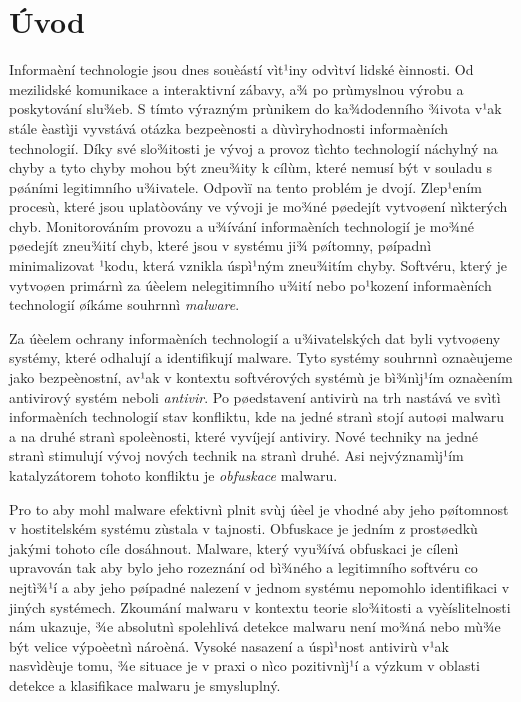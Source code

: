 

\chapter{Úvod}
Informaèní technologie jsou dnes souèástí vìt¹iny odvìtví lidské èinnosti. Od mezilidské komunikace a interaktivní zábavy, a¾ po prùmyslnou výrobu a poskytování slu¾eb. S tímto výrazným prùnikem do ka¾dodenního ¾ivota v¹ak stále èastìji vyvstává otázka bezpeènosti a dùvìryhodnosti informaèních technologií. Díky své slo¾itosti je vývoj a provoz tìchto technologií náchylný na chyby a tyto chyby mohou být zneu¾ity k cílùm, které nemusí být v souladu s pøáními legitimního u¾ivatele. Odpovìï na tento problém je dvojí. Zlep¹ením procesù, které jsou uplatòovány ve vývoji je mo¾né pøedejít vytvoøení nìkterých chyb. Monitorováním provozu a u¾ívání informaèních technologií je mo¾né pøedejít zneu¾ití chyb, které jsou v systému ji¾ pøítomny, pøípadnì minimalizovat ¹kodu, která vznikla úspì¹ným zneu¾itím chyby. Softvéru, který je vytvoøen primárnì za úèelem nelegitimního u¾ití nebo po¹kození informaèních technologií øíkáme souhrnnì \emph{malware}. 

Za úèelem ochrany informaèních technologií a u¾ivatelských dat byli vytvoøeny systémy, které odhalují a identifikují malware. Tyto systémy souhrnnì oznaèujeme jako bezpeènostní, av¹ak v kontextu softvérových systémù je bì¾nìj¹ím oznaèením antivirový systém neboli \emph{antivir}. Po pøedstavení antivirù na trh nastává ve svìtì informaèních technologií stav konfliktu, kde na jedné stranì stojí autoøi malwaru a na druhé stranì spoleènosti, které vyvíjejí antiviry. Nové techniky na jedné stranì stimulují vývoj nových technik na stranì druhé. Asi nejvýznamìj¹ím katalyzátorem tohoto konfliktu je \emph{obfuskace} malwaru.

Pro to aby mohl malware efektivnì plnit svùj úèel je vhodné aby jeho pøítomnost v hostitelském systému zùstala v tajnosti. Obfuskace je jedním z prostøedkù jakými tohoto cíle dosáhnout. Malware, který vyu¾ívá obfuskaci je cílenì upravován tak aby bylo jeho rozeznání od bì¾ného a legitimního softvéru co nejtì¾¹í a aby jeho pøípadné nalezení v jednom systému nepomohlo identifikaci v jiných systémech. Zkoumání malwaru v kontextu teorie slo¾itosti a vyèíslitelnosti nám ukazuje, ¾e absolutnì spolehlivá detekce malwaru není mo¾ná\cite{Cohen86} nebo mù¾e být velice výpoèetnì nároèná\cite{Filiol12}. Vysoké nasazení a úspì¹nost antivirù v¹ak nasvìdèuje tomu, ¾e situace je v praxi o nìco pozitivnìj¹í a výzkum v oblasti detekce a klasifikace malwaru je smysluplný.

